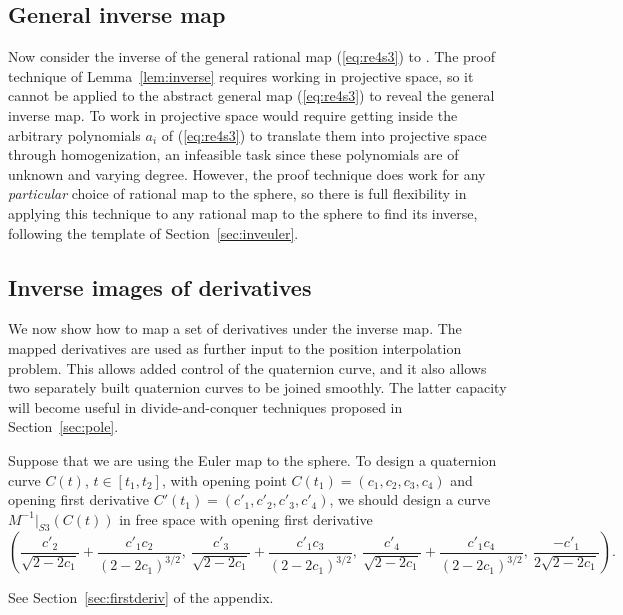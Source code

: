\documentclass[12pt]{article}
\begin{document}
\subsection{General inverse map}

Now consider the inverse of the general rational map (\ref{eq:re4s3}) to .
The proof technique of Lemma~\ref{lem:inverse}
requires working in projective space, 
so it cannot be applied to the abstract general map (\ref{eq:re4s3})
to reveal the general inverse map.
To work in projective space
would require getting inside the arbitrary polynomials
$a_i$ of (\ref{eq:re4s3}) to translate them into projective space through homogenization,
an infeasible task since these polynomials are of unknown and varying degree.
However, the proof technique does work for any {\em particular} choice of rational
map to the sphere, so there is full flexibility in applying this technique
to any rational map to the sphere to find its inverse, following the template
of Section~\ref{sec:inveuler}.

\subsection{Inverse images of derivatives}
\label{sec:deriv}

We now show how to map a set of derivatives under the inverse map.
The mapped derivatives are used as further input to the position interpolation problem.
This allows added control of the quaternion curve, and it also allows 
two separately built quaternion curves to be joined smoothly.
The latter capacity will become useful in divide-and-conquer techniques proposed
in Section~\ref{sec:pole}.

\begin{lemma}
\label{lem:firstderiv}
Suppose that we are using the Euler map to the sphere.
To design a quaternion curve
$C(t)$, $t \in [t_1,t_2]$, with opening point $C(t_1) = (c_1,c_2,c_3,c_4)$ 
and opening first derivative $C'(t_1) = (c'_1,c'_2,c'_3,c'_4)$,
we should design a curve $M^{-1}|_{S3}(C(t))$ in free space with opening first derivative
\[
(\frac{c'_2}{\sqrt{2-2c_1}} + \frac{c'_1c_2}{(2-2c_1)^{3/2}},\ 
 \frac{c'_3}{\sqrt{2-2c_1}} + \frac{c'_1c_3}{(2-2c_1)^{3/2}},\ 
 \frac{c'_4}{\sqrt{2-2c_1}} + \frac{c'_1c_4}{(2-2c_1)^{3/2}},\ 
 \frac{-c'_1}{2\sqrt{2-2c_1}}).
\]
\end{lemma}
\prf
See Section~\ref{sec:firstderiv} of the appendix.
\QED
\end{document}
